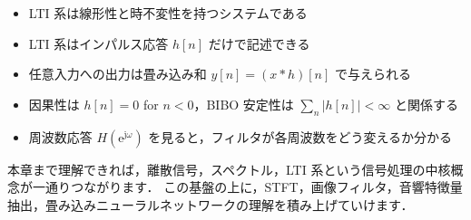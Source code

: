 \begin{itemize}
\item LTI 系は線形性と時不変性を持つシステムである
\item LTI 系はインパルス応答 $h[n]$ だけで記述できる
\item 任意入力への出力は畳み込み和 $y[n] = (x*h)[n]$ で与えられる
\item 因果性は $h[n]=0$ for $n<0$，BIBO 安定性は $\sum_n |h[n]| < \infty$ と関係する
\item 周波数応答 $H(\mathrm{e}^{\mathrm{j}\omega})$ を見ると，フィルタが各周波数をどう変えるか分かる
\end{itemize}

本章まで理解できれば，離散信号，スペクトル，LTI 系という信号処理の中核概念が一通りつながります．
この基盤の上に，STFT，画像フィルタ，音響特徴量抽出，畳み込みニューラルネットワークの理解を積み上げていけます．
